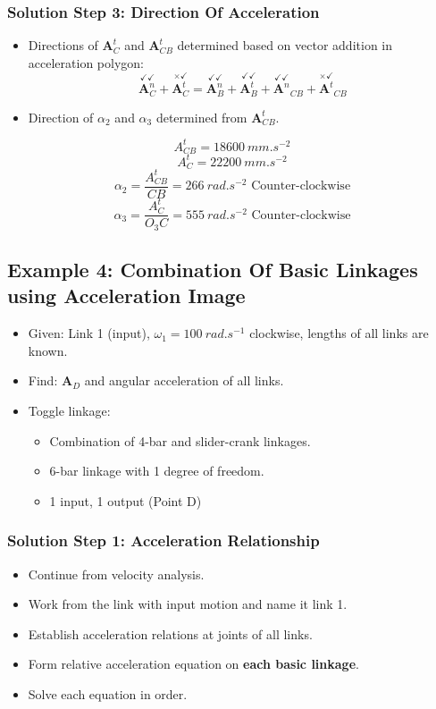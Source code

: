 \documentclass[11pt]{article}
\begin{document}
\subsubsection{Solution Step 3: Direction Of Acceleration}
\label{sec:org1094648}
\begin{itemize}
\item Directions of \(\boldsymbol{A}_C^t\) and \(\boldsymbol{A}_{CB}^t\) determined based on vector addition in acceleration polygon:
\[\overset{\checkmark \checkmark}{\boldsymbol{A}_C^n} + \overset{\times \checkmark}{\boldsymbol{A}_C^t} = \overset{\checkmark \checkmark}{\boldsymbol{A}_B^n} + \overset{\checkmark \checkmark}{\boldsymbol{A}_B^t} + \overset{\checkmark \checkmark}{\boldsymbol{A}^n}_{CB} +  \overset{\times \checkmark}{\boldsymbol{A}^t}_{CB}\]
\item Direction of \(\alpha_2\) and \(\alpha_3\) determined from \(\boldsymbol{A}_{CB}^t\).
\end{itemize}
\[A_{CB}^t = \qty{18600}{mm.s^{-2}}\]
\[A_C^t = \qty{22200}{mm.s^{-2}}\]
\[\alpha_2 = \frac{A_{CB}^t}{CB} = \qty{266}{rad.s^{-2}} \text{ Counter-clockwise}\]
\[\alpha_3 = \frac{A_C^t}{O_3 C} = \qty{555}{rad.s^{-2}} \text{ Counter-clockwise}\]

 \newpage
\subsection{Example 4: Combination Of Basic Linkages using Acceleration Image}
\label{sec:orgff8b4d2}
\begin{itemize}
\item Given: Link 1 (input), \(\omega_1 = \qty{100}{rad.s^{-1}}\) clockwise, lengths of all links are known.
\item Find: \(\boldsymbol{A}_D\) and angular acceleration of all links.
\item Toggle linkage:
\begin{itemize}
\item Combination of 4-bar and slider-crank linkages.
\item 6-bar linkage with 1 degree of freedom.
\item 1 input, 1 output (Point D)
\end{itemize}
\end{itemize}
\subsubsection{Solution Step 1: Acceleration Relationship}
\label{sec:org6ab977c}
\begin{itemize}
\item Continue from velocity analysis.
\item Work from the link with input motion and name it link 1.
\item Establish acceleration relations at joints of all links.
\item Form relative acceleration equation on \textbf{each basic linkage}.
\item Solve each equation in order.
\end{itemize}
\end{document}
